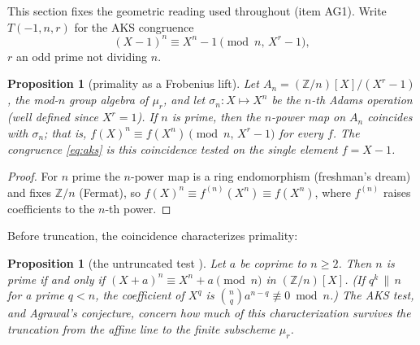 \documentclass[11pt]{article}
\newtheorem{proposition}[theorem]{Proposition}
\theoremstyle{remark}
\newcommand{\Z}{\mathbb{Z}}
\begin{document}
This section fixes the geometric reading used throughout (item AG1). Write
$T(-1,n,r)$ for the AKS congruence
\begin{equation}\label{eq:aks}
(X-1)^n \equiv X^n - 1 \pmod{n,\, X^r-1},
\end{equation}
$r$ an odd prime not dividing $n$.

\begin{proposition}[primality as a Frobenius lift]\label{prop:lift}
Let $A_n = (\Z/n)[X]/(X^r-1)$, the mod-$n$ group algebra of $\mu_r$, and let
$\sigma_n : X \mapsto X^n$ be the $n$-th Adams operation (well defined since
$X^r = 1$). If $n$ is prime, then the $n$-power map on $A_n$ coincides with
$\sigma_n$; that is, $f(X)^n \equiv f(X^n) \pmod{n,\,X^r-1}$ for
\emph{every} $f$. The congruence \eqref{eq:aks} is this coincidence tested on
the single element $f = X-1$.
\end{proposition}

\begin{proof}
For $n$ prime the $n$-power map is a ring endomorphism (freshman's dream) and
fixes $\Z/n$ (Fermat), so $f(X)^n \equiv f^{(n)}(X^n) \equiv f(X^n)$, where
$f^{(n)}$ raises coefficients to the $n$-th power.
\end{proof}

Before truncation, the coincidence characterizes primality:

\begin{proposition}[the untruncated test {\cite[Lemma 2.1]{AKS}}]
\label{prop:untrunc}
Let $a$ be coprime to $n \ge 2$. Then $n$ is prime if and only if
$(X + a)^n \equiv X^n + a \pmod n$ in $(\Z/n)[X]$. (If $q^k \,\|\, n$ for a
prime $q < n$, the coefficient of $X^q$ is $\binom{n}{q} a^{n-q}
\not\equiv 0 \bmod n$.) The AKS test, and Agrawal's conjecture, concern how
much of this characterization survives the truncation from the affine line
to the finite subscheme $\mu_r$.
\end{proposition}
\end{document}
